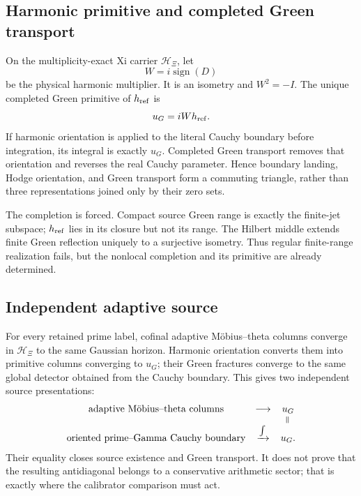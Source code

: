 \documentclass[11pt]{article}
\theoremstyle{definition}
\theoremstyle{remark}
\numberwithin{equation}{section}
\newcommand{\cH}{\mathcal H}
\begin{document}
\subsection{Harmonic primitive and completed Green transport}

On the multiplicity-exact Xi carrier $\cH_\Xi$, let
\[
                         W=i\operatorname{sign}(D)
\]
be the physical harmonic multiplier.  It is an isometry and $W^2=-I$.
The unique completed Green primitive of $h_{\rm ref}$ is
\begin{equation}
                             u_G=iWh_{\rm ref}.
 \label{eq:green-primitive}
\end{equation}
If harmonic orientation is applied to the literal Cauchy boundary before
integration, its integral is exactly $u_G$.  Completed Green transport
removes that orientation and reverses the real Cauchy parameter.  Hence
boundary landing, Hodge orientation, and Green transport form a commuting
triangle, rather than three representations joined only by their zero sets.

The completion is forced.  Compact source Green range is exactly the
finite-jet subspace; $h_{\rm ref}$ lies in its closure but not its range.
The Hilbert middle extends finite Green reflection uniquely to a surjective
isometry.  Thus regular finite-range realization fails, but the nonlocal
completion and its primitive are already determined.

\subsection{Independent adaptive source}

For every retained prime label, cofinal adaptive M\"obius--theta columns
converge in $\cH_\Xi$ to the same Gaussian horizon.  Harmonic orientation
converts them into primitive columns converging to $u_G$; their Green
fractures converge to the same global detector obtained from the Cauchy
boundary.  This gives two independent source presentations:
\[
 \begin{matrix}
 \text{adaptive M\"obius--theta columns}&\longrightarrow&u_G\\
 &&\rotatebox{90}{$=$}\\[-1mm]
 \text{oriented prime--Gamma Cauchy boundary}&\xrightarrow{\int}&u_G.
 \end{matrix}
 \label{eq:common-boundary}
\]
Their equality closes source existence and Green transport.  It does not
prove that the resulting antidiagonal belongs to a conservative arithmetic
sector; that is exactly where the calibrator comparison must act.
\end{document}
